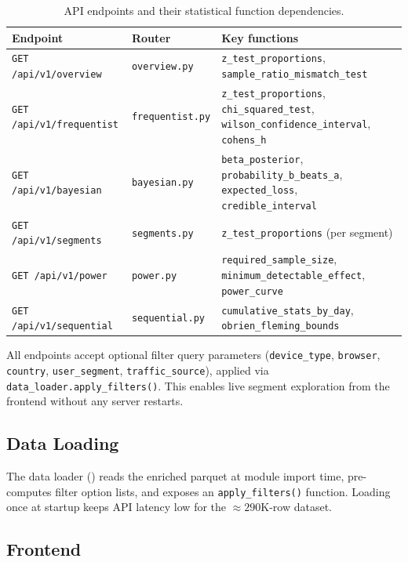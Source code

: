 \begin{table}[h]
  \centering
  \small
  \begin{tabular}{lll}
    \toprule
    Endpoint & Router & Key functions \\
    \midrule
    \texttt{GET /api/v1/overview} & \texttt{overview.py} &
      \texttt{z\_test\_proportions}, \texttt{sample\_ratio\_mismatch\_test} \\
    \texttt{GET /api/v1/frequentist} & \texttt{frequentist.py} &
      \texttt{z\_test\_proportions}, \texttt{chi\_squared\_test},
      \texttt{wilson\_confidence\_interval}, \texttt{cohens\_h} \\
    \texttt{GET /api/v1/bayesian} & \texttt{bayesian.py} &
      \texttt{beta\_posterior}, \texttt{probability\_b\_beats\_a},
      \texttt{expected\_loss}, \texttt{credible\_interval} \\
    \texttt{GET /api/v1/segments} & \texttt{segments.py} &
      \texttt{z\_test\_proportions} (per segment) \\
    \texttt{GET /api/v1/power} & \texttt{power.py} &
      \texttt{required\_sample\_size}, \texttt{minimum\_detectable\_effect},
      \texttt{power\_curve} \\
    \texttt{GET /api/v1/sequential} & \texttt{sequential.py} &
      \texttt{cumulative\_stats\_by\_day}, \texttt{obrien\_fleming\_bounds} \\
    \bottomrule
  \end{tabular}
  \caption{API endpoints and their statistical function dependencies.}
  \label{tab:abtest-api}
\end{table}

All endpoints accept optional filter query parameters (\texttt{device\_type},
\texttt{browser}, \texttt{country}, \texttt{user\_segment},
\texttt{traffic\_source}), applied via \texttt{data\_loader.apply\_filters()}.
This enables live segment exploration from the frontend without any server
restarts.

\subsection{Data Loading}

The data loader () reads the enriched parquet at
module import time, pre-computes filter option lists, and exposes an
\texttt{apply\_filters()} function. Loading once at startup keeps API latency
low for the $\approx 290$K-row dataset.

\subsection{Frontend}

